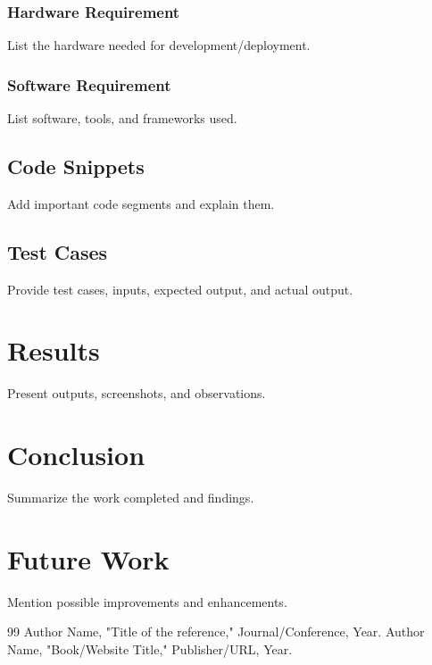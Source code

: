 \documentclass[12pt, a4paper]{report}
\begin{document}
\subsubsection{Hardware Requirement}
List the hardware needed for development/deployment.

\subsubsection{Software Requirement}
List software, tools, and frameworks used.

\subsection{Code Snippets}
Add important code segments and explain them.

\subsection{Test Cases}
Provide test cases, inputs, expected output, and actual output.

\section{Results}
Present outputs, screenshots, and observations.

\section{Conclusion}
Summarize the work completed and findings.

\section{Future Work}
Mention possible improvements and enhancements.

\clearpage
\begin{thebibliography}{99}
 Author Name, "Title of the reference," Journal/Conference, Year.
 Author Name, "Book/Website Title," Publisher/URL, Year.
\end{thebibliography}

\end{document}
